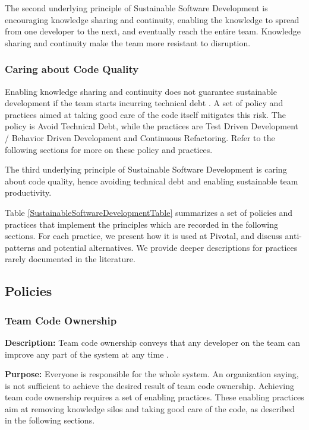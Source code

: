 The second underlying principle of Sustainable Software Development is encouraging knowledge sharing and continuity, enabling the knowledge to spread from one developer to the next, and eventually reach the entire team. Knowledge sharing and continuity make the team more resistant to disruption. 

\subsubsection{Caring about Code Quality}

Enabling knowledge sharing and continuity does not guarantee sustainable development if the team starts incurring technical debt  \cite{McConnellTechnicalDebt}. A set of policy and practices aimed at taking good care of the code itself mitigates this risk. The policy is Avoid Technical Debt, while the practices are Test Driven Development / Behavior Driven Development and Continuous Refactoring. Refer to the following sections for more on these policy and practices.

The third underlying principle of Sustainable Software Development is caring about code quality, hence avoiding technical debt and enabling sustainable team productivity.

Table \ref{SustainableSoftwareDevelopmentTable} summarizes a set of policies and practices that implement the principles which are recorded in the following sections. For each practice, we present how it is used at Pivotal, and discuss anti-patterns and potential alternatives. We provide deeper descriptions for practices rarely documented in the literature.
\subsection{Policies}

\subsubsection{Team Code Ownership}

\textbf{Description:} Team code ownership conveys that any developer on the team can improve any part of the system at any time \cite{BeckExtremeProgramming2004}. 

\textbf{Purpose:} Everyone is responsible for the whole system. An organization saying,  is not sufficient to achieve the desired result of team code ownership. Achieving team code ownership requires a set of enabling practices. These enabling practices aim at removing knowledge silos and taking good care of the code, as described in the following sections.

